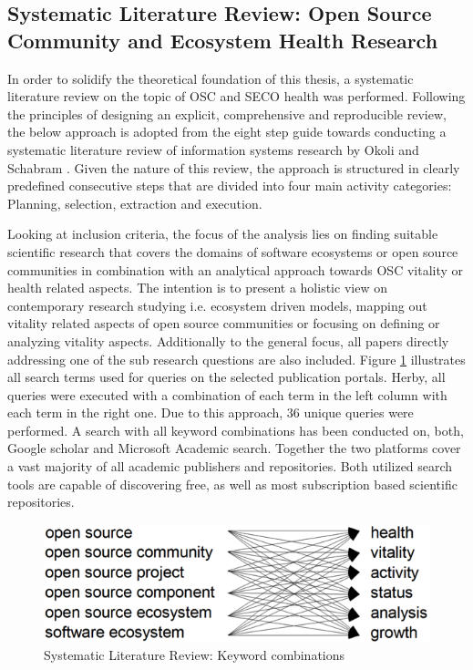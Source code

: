 \documentclass[final,5p,times,twocolumn]{elsarticle}
\begin{document}
\subsection{Systematic Literature Review: Open Source Community and Ecosystem Health Research}
In order to solidify the theoretical foundation of this thesis, a systematic literature review on the topic of OSC and SECO health was performed. Following the principles of designing an explicit, comprehensive and reproducible review, the below approach is adopted from the eight step guide towards conducting a systematic literature review of information systems research by Okoli and Schabram \cite{Okoli2010}. Given the nature of this review, the approach is structured in clearly predefined consecutive steps that are divided into four main activity categories: Planning, selection, extraction and execution.

Looking at inclusion criteria, the focus of the analysis lies on finding suitable scientific research that covers the domains of software ecosystems or open source communities in combination with an analytical approach towards OSC vitality or health related aspects. The intention is to present a holistic view on contemporary research studying i.e. ecosystem driven models, mapping out vitality related aspects of open source communities or focusing on defining or analyzing vitality aspects. Additionally to the general focus, all papers directly addressing one of the sub research questions are also included. Figure \ref{fig:fig:keywords} illustrates all search terms used for queries on the selected publication portals. Herby, all queries were executed with a combination of each term in the left column with each term in the right one. Due to this approach, 36 unique queries were performed. A search with all keyword combinations has been conducted on, both, Google scholar and Microsoft Academic search. Together the two platforms cover a vast majority of all academic publishers and repositories. Both utilized search tools are capable of discovering free, as well as most subscription based scientific repositories.
\begin{figure}[htp]
\begin{center}
\includegraphics[scale=0.8]{figures/keyword_combinations.png}
\caption{Systematic Literature Review: Keyword combinations}
\label{fig:fig:keywords}
\end{center}
\end{figure}
\end{document}
